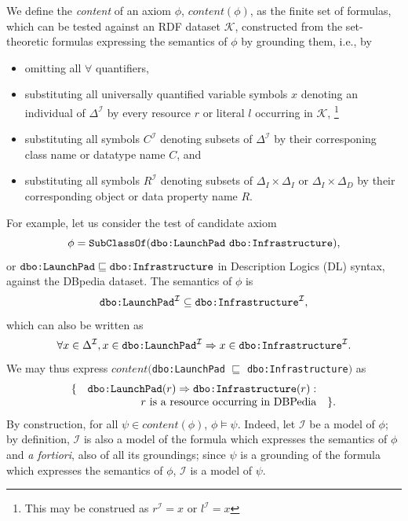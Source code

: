 \documentclass{llncs}
\begin{document}
We define the \emph{content} of an axiom $\phi$, $content(\phi)$, as the finite set of formulas,
which can be tested against an RDF dataset $\mathcal{K}$,
constructed from the set-theoretic formulas expressing the semantics of $\phi$
by grounding them, i.e., by
\begin{itemize}
\item omitting all $\forall$ quantifiers,
\item substituting all universally quantified variable symbols $x$ denoting an individual
of $\Delta^\mathcal{I}$ by every resource $r$ or literal $l$ occurring in $\mathcal{K}$,%
\footnote{This may be construed as $r^\mathcal{I} = x$ or $l^\mathcal{I} = x$}
\item substituting all symbols $C^\mathcal{I}$ denoting subsets of $\Delta^\mathcal{I}$
by their corresponing class name or datatype name $C$, and
\item substituting all symbols $R^\mathcal{I}$ denoting subsets of $\Delta_{I}\times\Delta_{I}$ or $\Delta_{I}\times\Delta_{D}$
by their corresponding object or data property name $R$.
\end{itemize}
For example, let us consider the test of candidate axiom
\[
  \phi = \mbox{\texttt{SubClassOf}(\texttt{dbo:LaunchPad} \texttt{dbo:Infrastructure})},
\]
or $\mbox{\tt dbo:LaunchPad} \sqsubseteq \mbox{\tt dbo:Infrastructure}$
in Description Logics (DL) syntax, against the DBpedia dataset.
The semantics of $\phi$ is
\[
  \mbox{\texttt{dbo:LaunchPad}}^\mathcal{I} \subseteq \mbox{\texttt{dbo:Infrastructure}}^\mathcal{I},
\]
which can also be written as
\[
  \forall x \in \Delta^\mathcal{I},
  x \in \mbox{\texttt{dbo:LaunchPad}}^\mathcal{I} \Rightarrow x \in \mbox{\texttt{dbo:Infrastructure}}^\mathcal{I}.
\]
We may thus express $content($\texttt{dbo:LaunchPad} $\sqsubseteq$ \texttt{dbo:Infrastructure}$)$ as
\[
  \begin{array}{rrl}
    \{ & \mbox{\tt dbo:LaunchPad}(r) \Rightarrow \mbox{\tt dbo:Infrastructure}(r) : &\\
       & \mbox{$r$ is a resource occurring in DBPedia} & \}.
  \end{array}
\]
By construction, for all $\psi \in content(\phi)$, $\phi \models \psi$.
Indeed, let $\mathcal{I}$ be a model of $\phi$;
by definition, $\mathcal{I}$ is also a model of the formula which expresses the semantics of $\phi$
and \emph{a fortiori}, also of all its groundings; since $\psi$ is a grounding of the
formula which expresses the semantics of $\phi$, $\mathcal{I}$ is a model of $\psi$.
\end{document}
